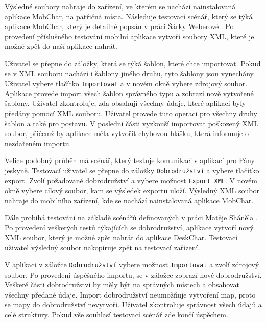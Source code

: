 \documentclass[thesis=B,czech]{resources/FITthesis}[2012/06/26]
\begin{document}
Výsledné soubory nahraje do zařízení, ve kterém se nachází nainstalovaná aplikace MobChar, na patřičná místa. Následuje testovací scénář, který se týká aplikace MobChar, který je detailně popsán v práci Šárky Weberové \cite{Weberova_2017}. Po provedení příslušného testování mobilní aplikace vytvoří soubory XML, které je možné zpět do naší aplikace nahrát. \par

Uživatel se přepne do záložky, která se týká šablon, které chce importovat. Pokud se v XML souboru nachází i šablony jiného druhu, tyto šablony jsou vynechány. Uživatel vybere tlačítko \texttt{Importovat} a v novém okně vybere zdrojový soubor. Aplikace provede import všech šablon správného typu a zobrazí nově vytvořené šablony. Uživatel zkontroluje, zda obsahují všechny údaje, které aplikaci byly předány pomocí XML souboru. Uživatel provede tuto operaci pro všechny druhy šablon a také pro postavu. V poslední části vyzkouší importovat poškozený XML soubor, přičemž by aplikace měla vytvořit chybovou hlášku, která informuje o nezdařeném importu. \par

Velice podobný průběh má scénář, který testuje komunikaci s aplikací pro Pány jeskyně. Testovací uživatel se přepne do záložky \texttt{Dobrodružství} a vybere tlačítko export. Zvolí požadované dobrodružství a vybere možnost \texttt{Export XML}. V novém okně vybere cílový soubor, kam se výsledek exportu uloží. Výsledný XML soubor nahraje do mobilního zařízení, kde se nachází nainstalovaná aplikace MobChar. \par

Dále probíhá testování na základě scénářů definovaných v práci Matěje Sháněla \cite{Shanel_2017}. Po provedení veškerých testů týkajících se dobrodružství, aplikace vytvoří nový XML soubor, který je možné zpět nahrát do aplikace DeskChar. Testovací uživatel výsledný soubor nakopíruje zpět na testovací zařízení. \par

V aplikaci v záložce \texttt{Dobrodružství} vybere možnost \texttt{Importovat} a zvolí zdrojový soubor. Po provedení úspěšného importu, se v záložce zobrazí nové dobrodružství. Veškeré části dobrodružství by měly být na správných místech a obsahovat všechny předané údaje. Import dobrodružství neumožňuje vytvoření map, proto se mapy do dobrodružství nevytvoří. Uživatel zkontroluje správnost všech údajů a celé struktury. Pokud vše souhlasí testovací scénář zde končí úspěchem.
\end{document}
